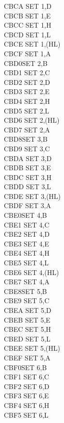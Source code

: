\documentclass[twoside,openright,a4paper]{book}
\begin{document}
\begin{multicols}{3}
{\begin{tabbing}
	CBCA\> 	SET 1,D\\
	CBCB\> 	SET 1,E\\
	CBCC\> 	SET 1,H\\
	CBCD\> 	SET 1,L\\
	CBCE\> 	SET 1,(HL)\\
	CBCF\> 	SET 1,A\\
	CBD0\>SET 2,B\\
	CBD1\> 	SET 2,C\\
	CBD2\> 	SET 2,D\\
	CBD3\> 	SET 2,E\\
	CBD4\> 	SET 2,H\\
	CBD5\> 	SET 2,L\\
	CBD6\> 	SET 2,(HL)\\
	CBD7\> 	SET 2,A\\
	CBD8\>SET 3,B\\
	CBD9\> 	SET 3,C\\
	CBDA\> 	SET 3,D\\
	CBDB\> 	SET 3,E\\
	CBDC\> 	SET 3,H\\
	CBDD\> 	SET 3,L\\
	CBDE\> 	SET 3,(HL)\\
	CBDF\> 	SET 3,A\\
	CBE0\>SET 4,B\\
	CBE1\> 	SET 4,C\\
	CBE2\> 	SET 4,D\\
	CBE3\> 	SET 4,E\\
	CBE4\> 	SET 4,H\\
	CBE5\> 	SET 4,L\\
	CBE6\> 	SET 4,(HL)\\
	CBE7\> 	SET 4,A\\
	CBE8\>SET 5,B\\
	CBE9\> 	SET 5,C\\
	CBEA\> 	SET 5,D\\
	CBEB\> 	SET 5,E\\
	CBEC\> 	SET 5,H\\
	CBED\> 	SET 5,L\\
	CBEE\> 	SET 5,(HL)\\
	CBEF\> 	SET 5,A\\
	CBF0\>SET 6,B\\
	CBF1\> 	SET 6,C\\
	CBF2\> 	SET 6,D\\
	CBF3\> 	SET 6,E\\
	CBF4\> 	SET 6,H\\
	CBF5\> 	SET 6,L\\

\end{tabbing}}
\end{multicols}
\end{document}
